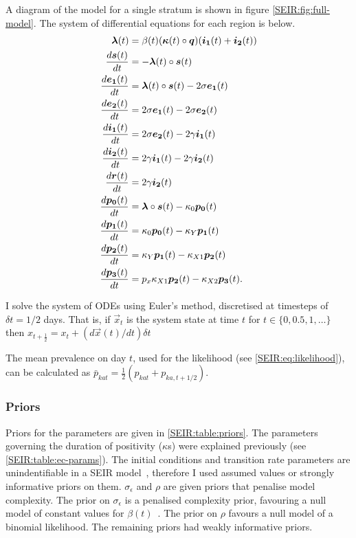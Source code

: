\documentclass[thesis.tex]{subfiles}
\begin{document}
A diagram of the model for a single stratum is shown in figure \cref{SEIR:fig:full-model}.
The system of differential equations for each region is below.
\begin{align}
    \label{SEIR:eq:fullODEs}
    \bm{\lambda}(t) &= \beta(t) (\bm{\kappa}(t) \circ \bm{q}) (\bm{i_1}(t) + \bm{i_2}(t)) \\
    \frac{d\bm{s}(t)}{dt} &= -\bm{\lambda}(t) \circ \bm{s}(t) \\
    \frac{d\bm{e_1}(t)}{dt} &= \bm{\lambda}(t) \circ \bm{s}(t) - 2\sigma \bm{e_1}(t) \\
    \frac{d\bm{e_2}(t)}{dt} &= 2\sigma \bm{e_1}(t) - 2\sigma \bm{e_2}(t) \\
    \frac{d\bm{i_1}(t)}{dt} &= 2\sigma \bm{e_2}(t) - 2\gamma \bm{i_1}(t) \\
    \frac{d\bm{i_2}(t)}{dt} &= 2\gamma \bm{i_1}(t) - 2\gamma \bm{i_2}(t) \\
    \frac{d\bm{r}(t)}{dt} &= 2\gamma \bm{i_2}(t) \\
    \frac{d\bm{p_0}(t)}{dt} &= \bm{\lambda} \circ \bm{s}(t) - \kappa_0 \bm{p_0}(t) \\
    \frac{d\bm{p_1}(t)}{dt} &= \kappa_0 \bm{p_0}(t) - \kappa_Y \bm{p_1}(t) \\
    \frac{d\bm{p_2}(t)}{dt} &= \kappa_Y \bm{p_1}(t) - \kappa_{X1} \bm{p_2}(t) \\
    \frac{d\bm{p_3}(t)}{dt} &= p_x \kappa_{X1} \bm{p_2}(t) - \kappa_{X2} \bm{p_3}(t).
\end{align}

I solve the system of ODEs using Euler's method, discretised at timesteps of $\delta t = 1/2$ days.
That is, if $\vec{x}_t$ is the system state at time $t$ for $t \in \{ 0, 0.5, 1, \dots \}$ then $x_{t+\frac{1}{2}} = x_t + (d\vec{x}(t)/dt) \delta t$

The mean prevalence on day $t$, used for the likelihood (see \cref{SEIR:eq:likelihood}), can be calculated as $\bar{p}_{kat} = \frac{1}{2} ( p_{kat} + p_{ka,t+1/2} )$.

\subsubsection{Priors} \label{SEIR:sec:priors}

Priors for the parameters are given in \cref{SEIR:table:priors}.
The parameters governing the duration of positivity ($\kappa$s) were explained previously (see \cref{SEIR:table:ec-params}).
The initial conditions and transition rate parameters are unindentifiable in a SEIR model~\autocite{dankwaStructural}, therefore I used assumed values or strongly informative priors on them.
$\sigma_\epsilon$ and $\rho$ are given priors that penalise model complexity.
The prior on $\sigma_\epsilon$ is a penalised complexity prior, favouring a null model of constant values for $\beta(t)$~\autocite{simpsonPenalising}.
The prior on $\rho$ favours a null model of a binomial likelihood.
The remaining priors had weakly informative priors.
\end{document}
